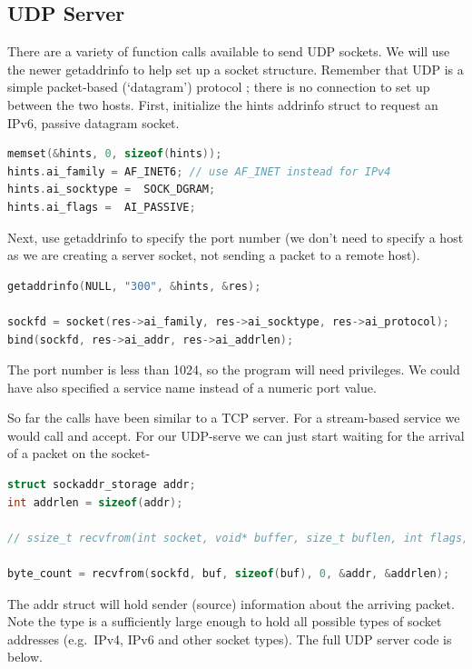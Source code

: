 \subsection{UDP Server}

There are a variety of function calls available to send UDP sockets.
We will use the newer getaddrinfo to help set up a socket structure.
Remember that UDP is a simple packet-based (`datagram') protocol ; there is no connection to set up between the two hosts.
First, initialize the hints addrinfo struct to request an IPv6, passive datagram socket.

\begin{lstlisting}[language=C]
memset(&hints, 0, sizeof(hints));
hints.ai_family = AF_INET6; // use AF_INET instead for IPv4
hints.ai_socktype =  SOCK_DGRAM;
hints.ai_flags =  AI_PASSIVE;
\end{lstlisting}

Next, use getaddrinfo to specify the port number (we don't need to specify a host as we are creating a server socket, not sending a packet to a remote host).

\begin{lstlisting}[language=C]
getaddrinfo(NULL, "300", &hints, &res);

sockfd = socket(res->ai_family, res->ai_socktype, res->ai_protocol);
bind(sockfd, res->ai_addr, res->ai_addrlen);
\end{lstlisting}

The port number is less than 1024, so the program will need  privileges.
We could have also specified a service name instead of a numeric port value.

So far the calls have been similar to a TCP server.
For a stream-based service we would call  and accept.
For our UDP-serve we can just start waiting for the arrival of a packet on the socket-

\begin{lstlisting}[language=C]
struct sockaddr_storage addr;
int addrlen = sizeof(addr);

// ssize_t recvfrom(int socket, void* buffer, size_t buflen, int flags, struct sockaddr *addr, socklen_t * address_len);

byte_count = recvfrom(sockfd, buf, sizeof(buf), 0, &addr, &addrlen);
\end{lstlisting}

The addr struct will hold sender (source) information about the arriving packet.
Note the  type is a sufficiently large enough to hold all possible types of socket addresses (e.g.~IPv4, IPv6 and other socket types).
The full UDP server code is below.


